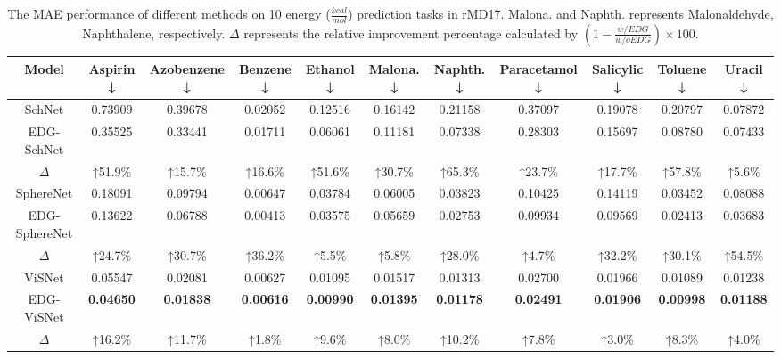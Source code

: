 \documentclass{article}
\begin{document}
\begin{table}[h]
  \scriptsize
  \centering
    \begin{tabular}{ccccccccccc}
    \toprule
    Model & Aspirin ↓ & Azobenzene ↓ & Benzene ↓ & Ethanol ↓ & Malona. ↓ & Naphth. ↓ & Paracetamol ↓ & Salicylic ↓ & Toluene ↓ & Uracil ↓ \\
    \midrule
    SchNet & 0.73909  & 0.39678  & 0.02052  & 0.12516  & 0.16142  & 0.21158  & 0.37097  & 0.19078  & 0.20797  & 0.07872  \\
    EDG-SchNet & 0.35525  & 0.33441  & 0.01711  & 0.06061  & 0.11181  & 0.07338  & 0.28303  & 0.15697  & 0.08780  & 0.07433  \\
    $\Delta$ & ↑51.9\% & ↑15.7\% & ↑16.6\% & ↑51.6\% & ↑30.7\% & ↑65.3\% & ↑23.7\% & ↑17.7\% & ↑57.8\% & ↑5.6\% \\
    \midrule
    SphereNet & 0.18091  & 0.09794  & 0.00647  & 0.03784  & 0.06005  & 0.03823  & 0.10425  & 0.14119  & 0.03452  & 0.08088  \\
    EDG-SphereNet & 0.13622  & 0.06788  & 0.00413  & 0.03575  & 0.05659  & 0.02753  & 0.09934  & 0.09569  & 0.02413  & 0.03683  \\
    $\Delta$ & ↑24.7\% & ↑30.7\% & ↑36.2\% & ↑5.5\% & ↑5.8\% & ↑28.0\% & ↑4.7\% & ↑32.2\% & ↑30.1\% & ↑54.5\% \\
    \midrule
    ViSNet & 0.05547  & 0.02081  & 0.00627  & 0.01095  & 0.01517  & 0.01313  & 0.02700  & 0.01966  & 0.01089  & 0.01238  \\
    EDG-ViSNet & \textbf{0.04650 } & \textbf{0.01838 } & \textbf{0.00616 } & \textbf{0.00990 } & \textbf{0.01395 } & \textbf{0.01178 } & \textbf{0.02491 } & \textbf{0.01906 } & \textbf{0.00998 } & \textbf{0.01188 } \\
    $\Delta$ & ↑16.2\% & ↑11.7\% & ↑1.8\% & ↑9.6\% & ↑8.0\% & ↑10.2\% & ↑7.8\% & ↑3.0\% & ↑8.3\% & ↑4.0\% \\
    \bottomrule
    \end{tabular}
  \caption{The MAE performance of different methods on 10 energy ($\frac{kcal}{mol}$) prediction tasks in rMD17. Malona. and Naphth. represents Malonaldehyde, Naphthalene, respectively. $\Delta$ represents the relative improvement percentage calculated by $(1-\frac{w/ EDG}{w/o EDG})\times 100$.}
  \label{tab:rmd17_energy}
\end{table}
\end{document}
